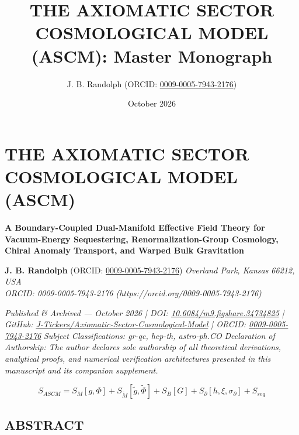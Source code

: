 \documentclass[aps,prd,onecolumn,superscriptaddress,nofootinbib,longbibliography,10pt]{revtex4-2}
\begin{document}
\title{THE AXIOMATIC SECTOR COSMOLOGICAL MODEL (ASCM): Master Monograph}
\author{J. B. Randolph (ORCID: \href{https://orcid.org/0009-0005-7943-2176}{0009-0005-7943-2176})}
\date{October 2026}
\maketitle


 

  
\section*{THE AXIOMATIC SECTOR COSMOLOGICAL MODEL (ASCM)}

  \textbf{A Boundary-Coupled Dual-Manifold Effective Field Theory for Vacuum-Energy Sequestering, Renormalization-Group Cosmology, Chiral Anomaly Transport, and Warped Bulk Gravitation}


  \textbf{J. B. Randolph} (ORCID: \href{https://orcid.org/0009-0005-7943-2176}{0009-0005-7943-2176})
  \textit{Overland Park, Kansas 66212, USA \\
\textit{ORCID: 0009-0005-7943-2176 (https://orcid.org/0009-0005-7943-2176)}}


  \textit{Published \& Archived — October 2026 | DOI: \href{https://doi.org/10.6084/m9.figshare.34734825}{10.6084/m9.figshare.34734825} | GitHub: \href{https://github.com/J-Tickers/Axiomatic-Sector-Cosmological-Model}{J-Tickers/Axiomatic-Sector-Cosmological-Model} | ORCID: \href{https://orcid.org/0009-0005-7943-2176}{0009-0005-7943-2176}}
  \textit{Subject Classifications: gr-qc, hep-th, astro-ph.CO}
  \textit{Declaration of Authorship: The author declares sole authorship of all theoretical derivations, analytical proofs, and numerical verification architectures presented in this manuscript and its companion supplement.}


  \[ S_{ASCM} = S_M[g,\Phi] + S_{\tilde{M}}[\tilde{g},\tilde{\Phi}] + S_B[G] + S_\partial[h,\xi,\sigma_\partial] + S_{seq} \]


 

  
\subsection*{ABSTRACT}
\end{document}
